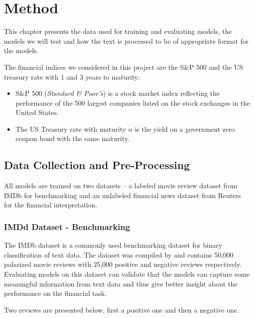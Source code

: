 \chapter{Method}

This chapter presents the data used for training and evaluating models, the models we will test and how the text is processed to be of appropriate format for the models. 

The financial indices we considered in this project are the S\&P 500 and the US treasury rate with 1 and 3 years to maturity:
\begin{itemize}
    \item S\&P 500 (\textit{Standard \& Poor's}) is a stock market index reflecting the performance of the 500 largest companies listed on the stock exchanges in the United States.
    \item The US Treasury rate with maturity $n$ is the yield on a government zero coupon bond with the same maturity. 
\end{itemize}

\section{Data Collection and Pre-Processing}

All models are trained on two datasets -- a labeled movie review dataset from IMDb for benchmarking and an unlabeled financial news dataset from Reuters for the financial interpretation. 

\subsection{IMDd Dataset - Benchmarking}
The IMDb dataset is a commonly used benchmarking dataset for binary classification of text data. The dataset was compiled by \citet{maas-EtAl:2011:ACL-HLT2011} and contains 50,000 polarized movie reviews with 25,000 positive and negative reviews respectively. Evaluating models on this dataset can validate that the models can capture some meaningful information from text data and thus give better insight about the performance on the financial task. 

Two reviews are presented below, first a positive one and then a negative one. 


